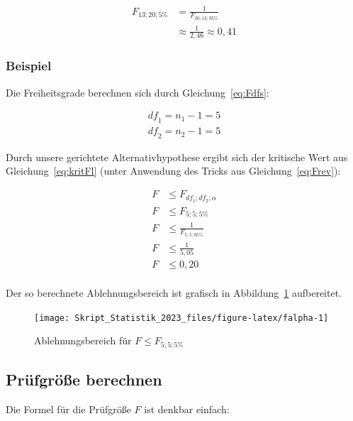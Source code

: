 \documentclass[
  11pt,
  ngerman,
  a4paper,
]{report}
\begin{document}
\[\begin{aligned}
F_{13;20;5\%}&=\frac{1}{F_{20;13;95\%}} \\[5pt]
&\approx\frac{1}{2{,}46}\approx0{,}41
\end{aligned}\]

\hypertarget{beispiel-20}{%
\subsubsection{Beispiel}\label{beispiel-20}}

Die Freiheitsgrade berechnen sich durch Gleichung~\eqref{eq:Fdfs}:

\[\begin{aligned}
\mathit{df}_1=n_1-1=5\\[4pt]
\mathit{df}_2=n_2-1=5
\end{aligned}\]

Durch unsere gerichtete Alternativhypothese ergibt sich der kritische Wert aus Gleichung~\eqref{eq:kritFl} (unter Anwendung des Tricks aus Gleichung~\eqref{eq:Frev}):

\[
\begin{aligned}
F &\leq F_{\mathit{df}_1;\mathit{df}_2;\alpha}\\
F &\leq F_{5;5;5\%}\\[5pt]
F &\leq \frac{1}{F_{5;5;95\%}}\\[5pt]
F &\leq \frac{1}{5{,}05}\\[4pt]
F &\leq 0{,}20\\[4pt]
\end{aligned}
\]

Der so berechnete Ablehnungsbereich ist grafisch in Abbildung~\ref{fig:falpha} aufbereitet.

\begin{figure}[!h]

{\centering \texttt{[image: Skript\_Statistik\_2023\_files/figure-latex/falpha-1]} 

}

\caption{Ablehnungsbereich für $F \leq F_{5;5;5\%}$}\label{fig:falpha}
\end{figure}

\hypertarget{pruxfcfgruxf6uxdfe-berechnen-3}{%
\subsection{Prüfgröße berechnen}\label{pruxfcfgruxf6uxdfe-berechnen-3}}

Die Formel für die Prüfgröße \(F\) ist denkbar einfach:
\end{document}
